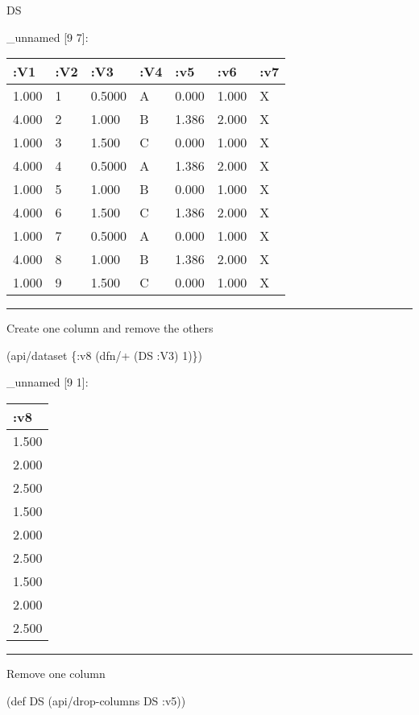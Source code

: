 \documentclass[]{article}
\newenvironment{Shaded}{\begin{snugshade}}{\end{snugshade}}
\newcommand{\DecValTok}[1]{\textcolor[rgb]{0.00,0.00,0.81}{#1}}
\newcommand{\FunctionTok}[1]{\textcolor[rgb]{0.00,0.00,0.00}{#1}}
\newcommand{\BuiltInTok}[1]{#1}
\newcommand{\AttributeTok}[1]{\textcolor[rgb]{0.77,0.63,0.00}{#1}}
\newcommand{\NormalTok}[1]{#1}
\begin{document}
\begin{Shaded}
\begin{Highlighting}[]
\NormalTok{DS}
\end{Highlighting}
\end{Shaded}

\_unnamed {[}9 7{]}:

\begin{longtable}[]{@{}lllllll@{}}
\toprule
:V1 & :V2 & :V3 & :V4 & :v5 & :v6 & :v7\tabularnewline
\midrule
\endhead
1.000 & 1 & 0.5000 & A & 0.000 & 1.000 & X\tabularnewline
4.000 & 2 & 1.000 & B & 1.386 & 2.000 & X\tabularnewline
1.000 & 3 & 1.500 & C & 0.000 & 1.000 & X\tabularnewline
4.000 & 4 & 0.5000 & A & 1.386 & 2.000 & X\tabularnewline
1.000 & 5 & 1.000 & B & 0.000 & 1.000 & X\tabularnewline
4.000 & 6 & 1.500 & C & 1.386 & 2.000 & X\tabularnewline
1.000 & 7 & 0.5000 & A & 0.000 & 1.000 & X\tabularnewline
4.000 & 8 & 1.000 & B & 1.386 & 2.000 & X\tabularnewline
1.000 & 9 & 1.500 & C & 0.000 & 1.000 & X\tabularnewline
\bottomrule
\end{longtable}

\begin{center}\rule{0.5\linewidth}{0.5pt}\end{center}

Create one column and remove the others

\begin{Shaded}
\begin{Highlighting}[]
\NormalTok{(api/dataset \{}\AttributeTok{:v8}\NormalTok{ (dfn/+ (DS }\AttributeTok{:V3}\NormalTok{) }\DecValTok{1}\NormalTok{)\})}
\end{Highlighting}
\end{Shaded}

\_unnamed {[}9 1{]}:

\begin{longtable}[]{@{}l@{}}
\toprule
:v8\tabularnewline
\midrule
\endhead
1.500\tabularnewline
2.000\tabularnewline
2.500\tabularnewline
1.500\tabularnewline
2.000\tabularnewline
2.500\tabularnewline
1.500\tabularnewline
2.000\tabularnewline
2.500\tabularnewline
\bottomrule
\end{longtable}

\begin{center}\rule{0.5\linewidth}{0.5pt}\end{center}

Remove one column

\begin{Shaded}
\begin{Highlighting}[]
\NormalTok{(}\BuiltInTok{def}\FunctionTok{ DS }\NormalTok{(api/drop-columns DS }\AttributeTok{:v5}\NormalTok{))}
\end{Highlighting}
\end{Shaded}
\end{document}
